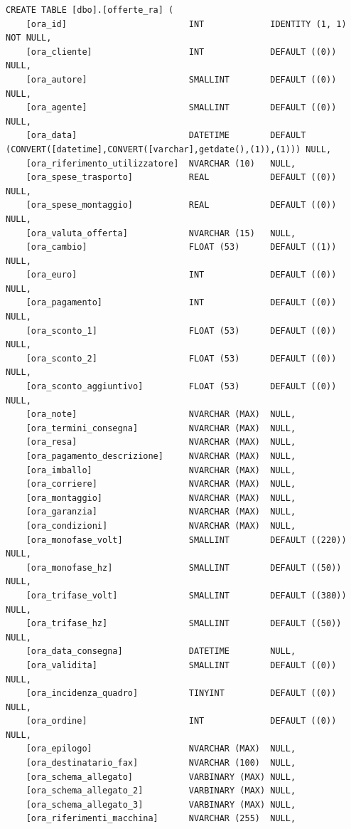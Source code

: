 \documentclass[12pt]{article}
\begin{document}
\begin{lstlisting}
CREATE TABLE [dbo].[offerte_ra] (
    [ora_id]                        INT             IDENTITY (1, 1) NOT NULL,
    [ora_cliente]                   INT             DEFAULT ((0)) NULL,
    [ora_autore]                    SMALLINT        DEFAULT ((0)) NULL,
    [ora_agente]                    SMALLINT        DEFAULT ((0)) NULL,
    [ora_data]                      DATETIME        DEFAULT (CONVERT([datetime],CONVERT([varchar],getdate(),(1)),(1))) NULL,
    [ora_riferimento_utilizzatore]  NVARCHAR (10)   NULL,
    [ora_spese_trasporto]           REAL            DEFAULT ((0)) NULL,
    [ora_spese_montaggio]           REAL            DEFAULT ((0)) NULL,
    [ora_valuta_offerta]            NVARCHAR (15)   NULL,
    [ora_cambio]                    FLOAT (53)      DEFAULT ((1)) NULL,
    [ora_euro]                      INT             DEFAULT ((0)) NULL,
    [ora_pagamento]                 INT             DEFAULT ((0)) NULL,
    [ora_sconto_1]                  FLOAT (53)      DEFAULT ((0)) NULL,
    [ora_sconto_2]                  FLOAT (53)      DEFAULT ((0)) NULL,
    [ora_sconto_aggiuntivo]         FLOAT (53)      DEFAULT ((0)) NULL,
    [ora_note]                      NVARCHAR (MAX)  NULL,
    [ora_termini_consegna]          NVARCHAR (MAX)  NULL,
    [ora_resa]                      NVARCHAR (MAX)  NULL,
    [ora_pagamento_descrizione]     NVARCHAR (MAX)  NULL,
    [ora_imballo]                   NVARCHAR (MAX)  NULL,
    [ora_corriere]                  NVARCHAR (MAX)  NULL,
    [ora_montaggio]                 NVARCHAR (MAX)  NULL,
    [ora_garanzia]                  NVARCHAR (MAX)  NULL,
    [ora_condizioni]                NVARCHAR (MAX)  NULL,
    [ora_monofase_volt]             SMALLINT        DEFAULT ((220)) NULL,
    [ora_monofase_hz]               SMALLINT        DEFAULT ((50)) NULL,
    [ora_trifase_volt]              SMALLINT        DEFAULT ((380)) NULL,
    [ora_trifase_hz]                SMALLINT        DEFAULT ((50)) NULL,
    [ora_data_consegna]             DATETIME        NULL,
    [ora_validita]                  SMALLINT        DEFAULT ((0)) NULL,
    [ora_incidenza_quadro]          TINYINT         DEFAULT ((0)) NULL,
    [ora_ordine]                    INT             DEFAULT ((0)) NULL,
    [ora_epilogo]                   NVARCHAR (MAX)  NULL,
    [ora_destinatario_fax]          NVARCHAR (100)  NULL,
    [ora_schema_allegato]           VARBINARY (MAX) NULL,
    [ora_schema_allegato_2]         VARBINARY (MAX) NULL,
    [ora_schema_allegato_3]         VARBINARY (MAX) NULL,
    [ora_riferimenti_macchina]      NVARCHAR (255)  NULL,

\end{lstlisting}
\end{document}
